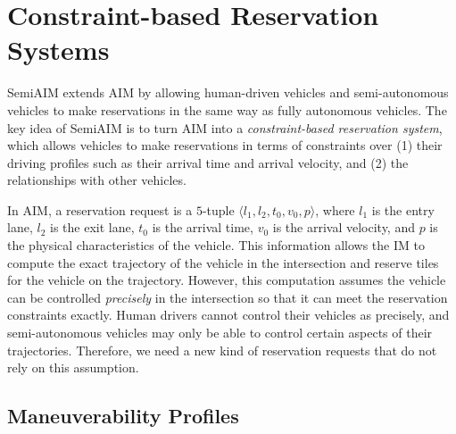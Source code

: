 \section{Constraint-based Reservation Systems}
\label{sec:constraint}

SemiAIM extends AIM by allowing human-driven vehicles and
semi-autonomous vehicles to make reservations in the same way as
fully autonomous vehicles.  The key idea of SemiAIM is to turn AIM into a
\emph{constraint-based reservation system}, which allows vehicles to
make reservations in terms of constraints over (1) their driving
profiles such as their arrival time and arrival velocity, and (2) the
relationships with other vehicles.

In AIM, a reservation request is a $5$-tuple $\langle l_1, l_2, t_0,
v_0, p\rangle$, where $l_1$ is the entry lane, $l_2$ is the exit lane,
$t_0$ is the arrival time, $v_0$ is the arrival velocity, and $p$ is
the physical characteristics of the vehicle.  This information allows
the IM to compute the exact trajectory of the vehicle in the
intersection and reserve tiles for the vehicle on the trajectory.
However, this computation assumes the vehicle can be controlled
\emph{precisely} in the intersection so that it can meet the
reservation constraints exactly.  Human drivers cannot control their
vehicles as precisely, and semi-autonomous vehicles may only be able
to control certain aspects of their trajectories.  Therefore, we need
a new kind of reservation requests that do not rely on this
assumption.

\subsection{Maneuverability Profiles} 

